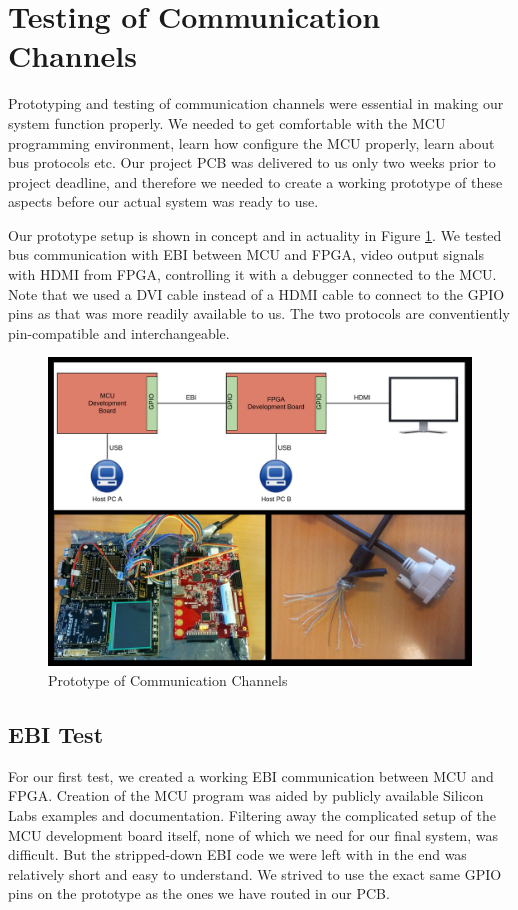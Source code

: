 \documentclass[../main/report.tex]{subfiles}
\begin{document}
\section{Testing of Communication Channels}
Prototyping and testing of communication channels were essential in making our system function properly.
We needed to get comfortable with the MCU programming environment, learn how configure the MCU properly, learn about bus protocols etc.
Our project PCB was delivered to us only two weeks prior to project deadline, and therefore we needed to create a working prototype of these aspects before our actual system was ready to use.

Our prototype setup is shown in concept and in actuality in Figure \ref{prototype}.
We tested bus communication with EBI between MCU and FPGA, video output signals with HDMI from FPGA, controlling it with a debugger connected to the MCU.
Note that we used a DVI cable instead of a HDMI cable to connect to the GPIO pins as that was more readily available to us. The two protocols are conventiently pin-compatible and interchangeable.

\begin{figure}[htp]
\centering
\includegraphics[width=\textwidth]{../diagrams/prototype_complete.png}
\caption{Prototype of Communication Channels}
\label{prototype}
\end{figure}

\subsection{EBI Test}
For our first test, we created a working EBI communication between MCU and FPGA.
Creation of the MCU program was aided by publicly available Silicon Labs examples and documentation.
Filtering away the complicated setup of the MCU development board itself, none of which we need for our final system, was difficult.
But the stripped-down EBI code we were left with in the end was relatively short and easy to understand.
We strived to use the exact same GPIO pins on the prototype as the ones we have routed in our PCB.
\end{document}
